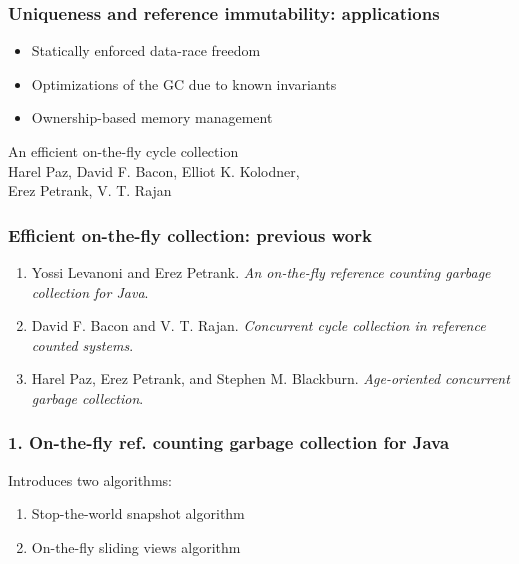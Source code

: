\begin{frame}
    \frametitle{Uniqueness and reference immutability: applications}

    \begin{itemize}
        \item Statically enforced data-race freedom
        \item Optimizations of the GC due to known invariants
        \item Ownership-based memory management
    \end{itemize}
\end{frame}

\begin{frame}
    \begin{center}
        {\LARGE An efficient on-the-fly cycle collection} \\
        \vspace{20pt}
        Harel Paz, David F. Bacon, Elliot K. Kolodner,\\
        Erez Petrank, V. T. Rajan
    \end{center}
\end{frame}

\begin{frame}
    \frametitle{Efficient on-the-fly collection: previous work}
    \begin{enumerate}
        \item
            Yossi Levanoni and Erez Petrank.
            \textit{An on-the-fly reference counting garbage collection for Java}.
        \item
            David F. Bacon and V. T. Rajan.
            \textit{Concurrent cycle collection in reference counted systems}.
        \item
            Harel Paz, Erez Petrank, and Stephen M. Blackburn.
            \textit{Age-oriented concurrent garbage collection}.
    \end{enumerate}
\end{frame}

\begin{frame}
    \frametitle{1. On-the-fly ref. counting garbage collection for Java}

    Introduces two algorithms:
    \begin{enumerate}
        \item Stop-the-world snapshot algorithm
        \item On-the-fly sliding views algorithm
    \end{enumerate}
\end{frame}

